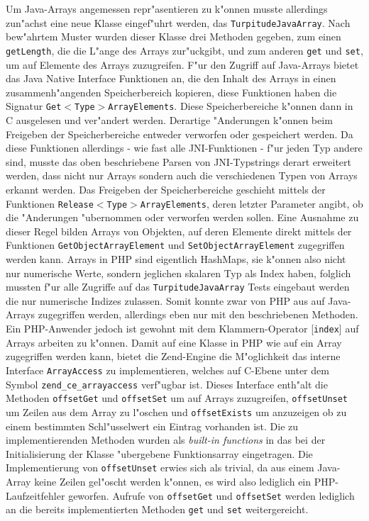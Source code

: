 Um Java-Arrays angemessen repr"asentieren zu k"onnen musste 
allerdings zun"achst eine neue Klasse eingef"uhrt werden, das \texttt{TurpitudeJavaArray}. Nach bew"ahrtem Muster wurden dieser Klasse drei Methoden
gegeben, zum einen \texttt{getLength}, die die L"ange des Arrays zur"uckgibt, und zum anderen \texttt{get} und \texttt{set}, um auf Elemente des Arrays zuzugreifen.
F"ur den Zugriff auf Java-Arrays bietet das Java Native Interface Funktionen an, die den Inhalt des Arrays in einen zusammenh"angenden Speicherbereich kopieren,
diese Funktionen haben die Signatur \texttt{Get$<$Type$>$ArrayElements}. Diese Speicherbereiche k"onnen  dann in C ausgelesen und ver"andert werden. 
Derartige "Anderungen k"onnen beim Freigeben der Speicherbereiche entweder verworfen oder gespeichert werden. Da diese
Funktionen allerdings - wie fast alle JNI-Funktionen - f"ur jeden Typ andere sind, musste das oben beschriebene Parsen von JNI-Typstrings derart erweitert werden,
dass nicht nur Arrays sondern auch die verschiedenen Typen von Arrays erkannt werden. Das Freigeben der Speicherbereiche geschieht mittels der
Funktionen \texttt{Release$<$Type$>$ArrayElements}, deren letzter Parameter angibt, ob die "Anderungen "ubernommen oder verworfen werden sollen.
Eine Ausnahme zu dieser Regel bilden Arrays von Objekten, auf deren Elemente direkt mittels der Funktionen \texttt{GetObjectArrayElement} und
\texttt{SetObjectArrayElement} zugegriffen werden kann.
Arrays in PHP sind eigentlich HashMaps, sie k"onnen also nicht nur numerische Werte, sondern jeglichen skalaren Typ als Index haben, folglich mussten
f"ur alle Zugriffe auf das \texttt{TurpitudeJavaArray} Tests eingebaut werden die nur numerische Indizes zulassen.
Somit konnte zwar von PHP aus auf Java-Arrays zugegriffen werden,
allerdings eben nur mit den beschriebenen Methoden. Ein PHP-Anwender jedoch ist gewohnt mit dem Klammern-Operator [\texttt{index}] auf Arrays arbeiten zu k"onnen.
Damit auf eine Klasse in PHP wie auf ein Array zugegriffen werden kann, bietet die Zend-Engine die M"oglichkeit das interne Interface \texttt{ArrayAccess} zu
implementieren, welches auf C-Ebene unter dem Symbol \texttt{zend\_ce\_arrayaccess} verf"ugbar ist. Dieses Interface enth"alt die Methoden \texttt{offsetGet} und
\texttt{offsetSet} um auf Arrays zuzugreifen, \texttt{offsetUnset} um Zeilen aus dem Array zu l"oschen und \texttt{offsetExists} um anzuzeigen ob zu einem
bestimmten Schl"usselwert ein Eintrag vorhanden ist. Die zu implementierenden Methoden wurden als \emph{built-in functions} in das bei der Initialisierung der
Klasse "ubergebene Funktionsarray eingetragen. Die Implementierung von \texttt{offsetUnset} erwies sich als trivial, da aus einem Java-Array keine
Zeilen gel"oscht werden k"onnen, es wird also lediglich ein PHP-Laufzeitfehler geworfen. Aufrufe von \texttt{offsetGet} und \texttt{offsetSet} werden lediglich
an die bereits implementierten Methoden \texttt{get} und \texttt{set} weitergereicht. 

